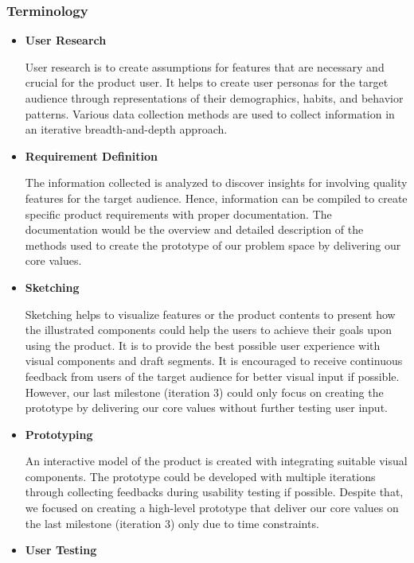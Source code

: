     \subsubsection{Terminology}
      \begin{itemize}
        \item \textbf{User Research}
          \par User research is to create assumptions for features that are necessary and crucial for the product user. It helps to create user personas for the target audience through representations of their demographics, habits, and behavior patterns. Various data collection methods are used to collect information in an iterative breadth-and-depth approach.
        \item \textbf{Requirement Definition}
          \par The information collected is analyzed to discover insights for involving quality features for the target
          audience. Hence, information can be compiled to create specific product requirements with proper
          documentation. The documentation would be the overview and detailed description of the methods
          used to create the prototype of our problem space by delivering our core values.
        \item \textbf{Sketching}
          \par Sketching helps to visualize features or the product contents to present how the illustrated
          components could help the users to achieve their goals upon using the product. It is to provide the
          best possible user experience with visual components and draft segments. It is encouraged to receive
          continuous feedback from users of the target audience for better visual input if possible. However,
          our last milestone (iteration 3) could only focus on creating the prototype by delivering our core
          values without further testing user input.
        \item \textbf{Prototyping}
          \par An interactive model of the product is created with integrating suitable visual components. The
          prototype could be developed with multiple iterations through collecting feedbacks during usability
          testing if possible. Despite that, we focused on creating a high-level prototype that deliver our core
          values on the last milestone (iteration 3) only due to time constraints.
        \item \textbf{User Testing}

\end{itemize}
